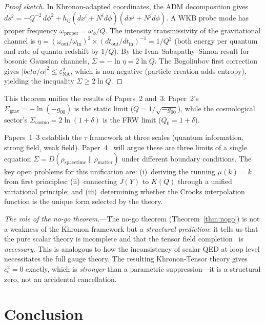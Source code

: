 \documentclass[prd,twocolumn,superscriptaddress,longbibliography,floatfix]{revtex4-2}
\newcommand{\tauasym}{\tau}
\newcommand{\cs}{c_{\mathrm{s}}}
\begin{document}
\begin{proof}[Proof sketch]
In Khronon-adapted coordinates, the ADM decomposition gives
$ds^2 = -Q^{-2}\,d\phi^2 + h_{ij}(dx^i + N^i d\phi)(dx^j
+ N^j d\phi)$.  A WKB probe mode has proper frequency
$\omega_{\mathrm{proper}} = \omega_\phi/Q$.  The intensity
transmissivity of the gravitational channel is
$\eta = (\omega_{\mathrm{out}}/\omega_{\mathrm{in}})^2
\times (dt_{\mathrm{out}}/dt_{\mathrm{in}})^{-1} = 1/Q^2$
(both energy per quantum and rate of quanta redshift by
$1/Q$).  By the Ivan--Sabapathy--Simon result for bosonic
Gaussian channels, $\Sigma = -\ln\eta = 2\ln Q$.  The
Bogoliubov first correction gives $|beta/\alpha|^2 \leq
\varepsilon_{\mathrm{NA}}^2$, which is non-negative
(particle creation adds entropy), yielding the
inequality $\Sigma \geq 2\ln Q$.
\end{proof}

This theorem unifies the results of Papers~2 and~3:
Paper~2's $\Sigma_{\mathrm{grav}} = -\ln(-g_{00})$ is the
static limit ($Q = 1/\sqrt{-g_{00}}$), while the
cosmological sector's $\Sigma_{\mathrm{cosmo}} = 2\ln(1+\delta)$
is the FRW limit ($Q_0 = 1 + \delta$).

Papers~1--3 establish the $\tauasym$ framework at three
scales (quantum information, strong field, weak field).
Paper~4~\cite{Paper4} will argue these are three limits of
a single equation
$\Sigma = D(\rho_{\mathrm{spacetime}} \| \rho_{\mathrm{matter}})$
under different boundary conditions.  The key open problems
for this unification are: (i)~deriving the running
$\mu(k) = k$ from first principles; (ii)~connecting $J(Y)$
to $K(Q)$ through a unified variational principle; and
(iii)~determining whether the Crooks interpolation function
is the unique form selected by the theory.

\emph{The role of the no-go theorem.}---The no-go theorem
(Theorem~\ref{thm:nogo}) is not a weakness of the Khronon framework
but a \emph{structural prediction}: it tells us that the pure scalar
theory is incomplete and that the tensor field completion~\cite{BS2025}
is \emph{necessary}.  This is analogous to how the inconsistency of
scalar QED at loop level necessitates the full gauge theory.  The
resulting Khronon-Tensor theory gives $\cs^2 = 0$ exactly, which is
\emph{stronger} than a parametric suppression---it is a structural
zero, not an accidental cancellation.


\section{Conclusion}
\label{sec:conclusion}
\end{document}
